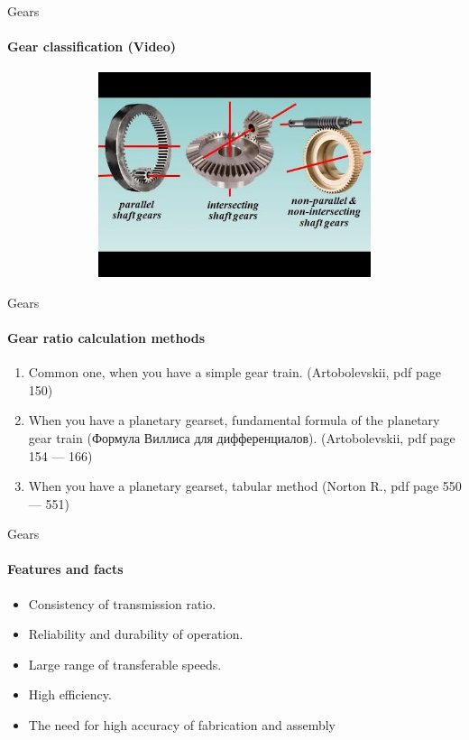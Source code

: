 \documentclass[aspectratio=169]{beamer}
\begin{document}
\begin{frame}[t]{Gears}
    \framesubtitle{Gear classification (Video)}
    \vspace{-0.6cm}
    \begin{figure}[H]
        \href{https://youtu.be/9n0Kn_0AHB4}{
            \centering\includegraphics[height=6cm,width=1\textwidth,keepaspectratio]{gear_classification_preview.jpg}}
        \label{fig:gear_classification_preview.jpg}
    \end{figure}
\end{frame}

\begin{frame}[t]{Gears}
    \framesubtitle{Gear ratio calculation methods}
    \begin{enumerate}
        \item Common one, when you have a simple gear train. (Artobolevskii, pdf page 150)
        \item When you have a planetary gearset, fundamental formula of the planetary gear train (Формула Виллиса для дифференциалов). (Artobolevskii, pdf page 154 --- 166)
        \item When you have a planetary gearset, tabular method (Norton R., pdf page 550 --- 551)
    \end{enumerate}
\end{frame}

\begin{frame}[t]{Gears}
    \framesubtitle{Features and facts}
    \begin{itemize}
        \item Consistency of transmission ratio.
        \item Reliability and durability of operation.
        \item Large range of transferable speeds.
        \item High efficiency.
        \item The need for high accuracy of fabrication and assembly
    \end{itemize}
\end{frame}
\end{document}
